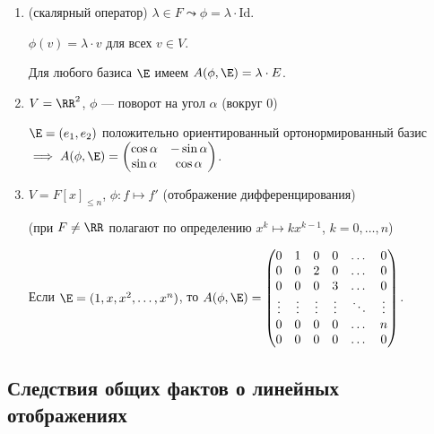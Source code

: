 \begin{enumerate}
    \item (скалярный оператор) $\lambda \in F \leadsto \phi = \lambda \cdot \mathrm{Id}$.

        $\phi(v) = \lambda \cdot v$ для всех $v \in V$.

        Для любого базиса $\E$ имеем $A(\phi, \E) = \lambda \cdot E$.

    \item $V = \RR^2$, $\phi$ --- поворот на угол $\alpha$ (вокруг 0)

        $\E = (e_1, e_2)$ положительно ориентированный ортонормированный базис $\implies A(\phi, \E) = \begin{pmatrix} 
            \cos \alpha & -\sin \alpha \\
            \sin \alpha & \cos \alpha
        \end{pmatrix}$.

    \item $V = F[x]_{\leq n}$, $\phi \colon f \mapsto f'$ (отображение дифференцирования)

        (при $F \neq \RR$ полагают по определению $x^k \mapsto kx^{k - 1}$, $k = 0, \dots, n$)

        Если $\E = (1, x, x^2, \dots, x^{n})$, то $A(\phi, \E) = \begin{pmatrix} 
            0 & 1 & 0 & 0 & \dots & 0 \\
            0 & 0 & 2 & 0 & \dots & 0 \\
            0 & 0 & 0 & 3 & \dots & 0 \\
            \vdots & \vdots & \vdots & \vdots & \ddots & \vdots \\
            0 & 0 & 0 & 0 & \dots & n \\
            0 & 0 & 0 & 0 & \dots & 0
        \end{pmatrix}$.
\end{enumerate}


\subsection{Следствия общих фактов о линейных отображениях}

